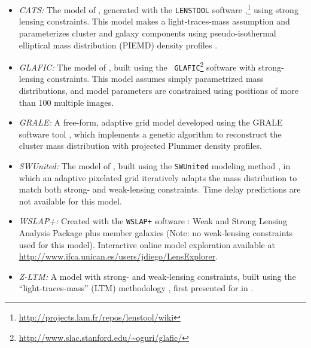 \bigskip
\begin{itemize}
\item{{\it CATS:} The model of \citet{Jauzac:2014}, generated with
  the {\tt LENSTOOL} software
  \citep{Jullo:2007},\footnote{\url{http://projects.lam.fr/repos/lenstool/wiki}}}
  using strong lensing constraints.  This model makes a
  light-traces-mass assumption and parameterizes cluster and galaxy components
  using pseudo-isothermal elliptical mass distribution (PIEMD) density profiles
  \citep{Eliasdottir:2007, Limousin:2007}.
\item{\it GLAFIC:} The model of \citet{Kawamata:2016}, built using
  the {\tt
    GLAFIC}\footnote{\url{http://www.slac.stanford.edu/~oguri/glafic/}}
  software \citep{Oguri:2010b} with strong-lensing constraints. This
  model assumes simply parametrized mass distributions, and model
  parameters are constrained using positions of more than 100 multiple
  images.
\item{{\it GRALE:} A free-form, adaptive grid model developed using
  the GRALE software tool \citep{Liesenborgs:2006, Liesenborgs:2007,
    Mohammed:2014, Sebesta:2016}, which implements a genetic algorithm
  to reconstruct the cluster mass distribution with projected Plummer
  \citeyear{Plummer:1911} density profiles.}
\item{\it SWUnited:} The model of \citet{Hoag:2016}, built using the
  {\tt SWUnited} modeling method \citep{Bradac:2005, Bradac:2009}, in
  which an adaptive pixelated grid iteratively adapts the mass
  distribution to match both strong- and weak-lensing constraints.
  Time delay predictions are not available for this model.
\item{\it WSLAP+:} Created with the {\tt WSLAP+} software
  \citep{Sendra:2014}: Weak and Strong Lensing Analysis Package plus
  member galaxies (Note: no weak-lensing constraints used for this
   model). Interactive online model exploration available at
  \url{http://www.ifca.unican.es/users/jdiego/LensExplorer}.
\item{{\it Z-LTM:} A model with strong- and weak-lensing constraints,
  built using the ``light-traces-mass'' (LTM) methodology
  \citep{Zitrin:2009a,Zitrin:2015}, first presented for  in
  \citet{Zitrin:2013a}.}
\end{itemize}
\bigskip    

